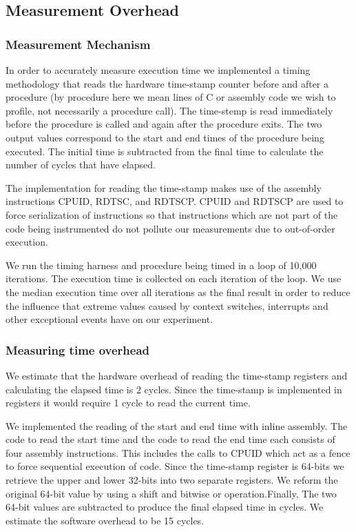 \subsection{Measurement Overhead}

\subsubsection{Measurement Mechanism} In order to accurately measure execution
time we implemented a timing methodology that reads the hardware time-stamp
counter before and after a procedure (by procedure here we mean lines of C or
assembly code we wish to profile, not necessarily a procedure call).  The
time-stemp is read immediately before the procedure is called and again after
the procedure exits. The two output values correspond to the start and end times
of the procedure being executed. The initial time is subtracted from the final
time to calculate the number of cycles that have elapsed.

The implementation for reading the time-stamp makes use of the assembly
instructions CPUID, RDTSC, and RDTSCP. CPUID and RDTSCP are used to force
serialization of instructions so that instructions which are not part of the
code being instrumented do not pollute our measurements due to out-of-order
execution.\cite{intel}

We run the timing harness and procedure being timed in a loop of 10,000
iterations. The execution time is collected on each iteration of the loop. We
use the median execution time over all iterations as the final result in order
to reduce the influence that extreme values caused by context switches,
interrupts and other exceptional events have on our experiment. 

\subsubsection{Measuring time overhead} 

We estimate that the hardware overhead of reading the time-stamp registers and
calculating the elapsed time is 2 cycles. Since the time-stamp is implemented in
registers it would require 1 cycle to read the current time. 

We implemented the reading of the start and end time with inline assembly. The
code to read the start time and the code to read the end time each consists of
four assembly instructions. This includes the calls to CPUID which act as a
fence to force sequential execution of code.  Since the time-stamp register is
64-bits we retrieve the upper and lower 32-bits into two separate registers. We
reform the original 64-bit value by using a shift and bitwise or
operation.Finally,  The two 64-bit values are subtracted to produce the final
elapsed time in cycles. We estimate the software overhead to be 15 cycles.


